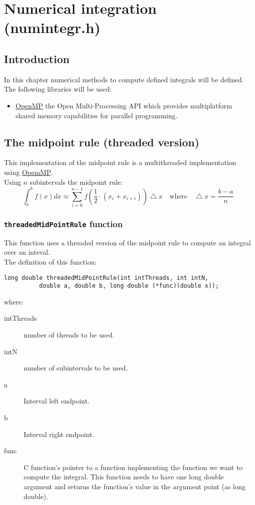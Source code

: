 %
%

\chapter{Numerical integration (numintegr.h)}

\section{Introduction}

In this chapter numerical methods to compute defined integrals will be defined.\\

The following libraries will be used:
%
\begin{itemize}
\item \href{http://www.openmp.org/}{OpenMP} the Open Multi-Processing API which provides multiplatform shared memory capabilities for parallel programming.
\end{itemize}

\section{The midpoint rule (threaded version)}

This implementation of the midpoint rule is a multithreaded implementation using \href{http://www.openmp.org}{OpemMP}.\\

Using $n$ subintervals the midpoint rule:
%
\begin{displaymath}
\int_a^b f(x) dx \approx \sum_{i=0}^{n-1} f(\frac{1}{2}\cdot (x_i + x_{i+i})) \bigtriangleup x \quad \textrm{where} \quad \bigtriangleup x = \frac{b - a}{n}  
\end{displaymath}
%

\subsection{\texttt{threadedMidPointRule} function} \label{sec:threadedMidPointRule}

This function uses a threaded version of the midpoint rule to compute an integral over an inteval.\\

The definition of this function:
%
\begin{verbatim}
long double threadedMidPointRule(int intThreads, int intN, 
          double a, double b, long double (*func)(double x));  
\end{verbatim}
%
where:
%
\begin{description}
\item[intThreads] number of threads to be used.
\item[intN] number of subintervals to be used.
\item[a] Interval left endpoint.
\item[b] Interval right endpoint.
\item[func] C function's pointer to a function implementing the function we want to compute the integral. This function needs to have one long double argument and returns the function's value in the argument point (as long double).
\end{description}

